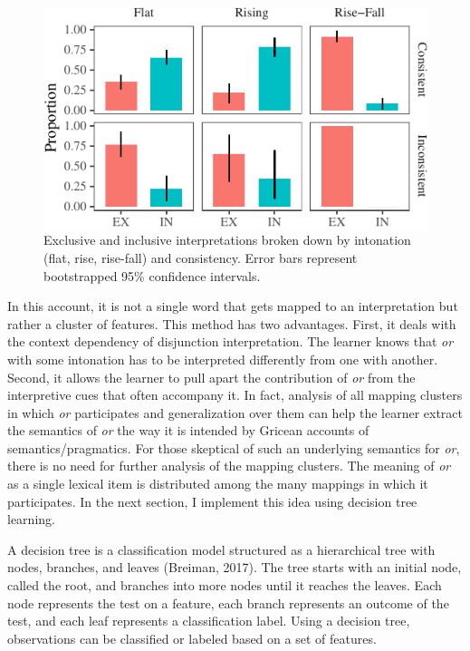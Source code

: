 \documentclass[floatsintext,man]{apa6}
\theoremstyle{definition}
\theoremstyle{definition}
\theoremstyle{definition}
\theoremstyle{remark}
\begin{document}
\begin{figure}[tb]

{\centering \includegraphics{figs/interpretationByIntonationAndConsistency-1} 

}

\caption{Exclusive and inclusive interpretations broken down by intonation (flat, rise, rise-fall) and consistency. Error bars represent bootstrapped 95\% confidence intervals.}\label{fig:interpretationByIntonationAndConsistency}
\end{figure}

In this account, it is not a single word that gets mapped to an
interpretation but rather a cluster of features. This method has two
advantages. First, it deals with the context dependency of disjunction
interpretation. The learner knows that \emph{or} with some intonation
has to be interpreted differently from one with another. Second, it
allows the learner to pull apart the contribution of \emph{or} from the
interpretive cues that often accompany it. In fact, analysis of all
mapping clusters in which \emph{or} participates and generalization over
them can help the learner extract the semantics of \emph{or} the way it
is intended by Gricean accounts of semantics/pragmatics. For those
skeptical of such an underlying semantics for \emph{or}, there is no
need for further analysis of the mapping clusters. The meaning of
\emph{or} as a single lexical item is distributed among the many
mappings in which it participates. In the next section, I implement this
idea using decision tree learning.

A decision tree is a classification model structured as a hierarchical
tree with nodes, branches, and leaves (Breiman, 2017). The tree starts
with an initial node, called the root, and branches into more nodes
until it reaches the leaves. Each node represents the test on a feature,
each branch represents an outcome of the test, and each leaf represents
a classification label. Using a decision tree, observations can be
classified or labeled based on a set of features.
\end{document}
